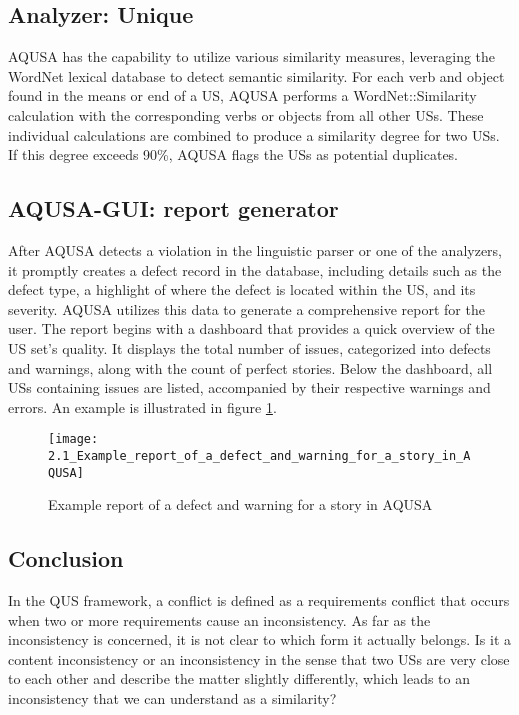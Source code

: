 \subsection*{\normalsize{Analyzer: Unique}}
AQUSA has the capability to utilize various similarity measures, leveraging the WordNet lexical database to detect semantic similarity. For each verb and object found in the means or end of a US, AQUSA performs a WordNet::Similarity calculation with the corresponding verbs or objects from all other USs. These individual calculations are combined to produce a similarity degree for two USs. If this degree exceeds 90\%, AQUSA flags the USs as potential duplicates. 
\subsection*{\normalsize{AQUSA-GUI: report generator}}
After AQUSA detects a violation in the linguistic parser or one of the analyzers, it promptly creates a defect record in the database, including details such as the defect type, a highlight of where the defect is located within the US, and its severity. AQUSA utilizes this data to generate a comprehensive report for the user.
The report begins with a dashboard that provides a quick overview of the US set's quality. It displays the total number of issues, categorized into defects and warnings, along with the count of perfect stories. Below the dashboard, all USs containing issues are listed, accompanied by their respective warnings and errors. An example is illustrated in figure \ref{fig:aqusa_report}.
\begin{figure}
\center
\texttt{[image: 2.1\_Example\_report\_of\_a\_defect\_and\_warning\_for\_a\_story\_in\_AQUSA]}
\caption{Example report of a defect and warning for a story in AQUSA \cite{lucassen2016improving}}\label{fig:aqusa_report}
\end{figure}
\subsection*{Conclusion} \label{usq_conclusion}
In the QUS framework, a conflict is defined as a requirements conflict that occurs when two or more requirements cause an inconsistency. As far as the inconsistency is concerned, it is not clear to which form it actually belongs. Is it a content inconsistency or an inconsistency in the sense that two USs are very close to each other and describe the matter slightly differently, which leads to an inconsistency that we can understand as a similarity?


